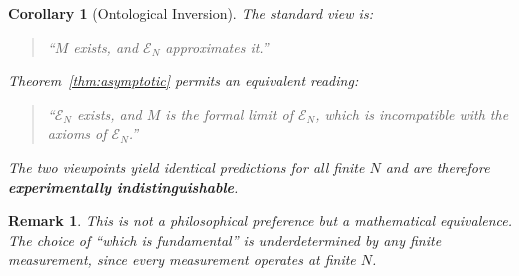 \documentclass[11pt]{article}
\newtheorem{corollary}[theorem]{Corollary}
\newtheorem{remark}[theorem]{Remark}
\begin{document}
\begin{corollary}[Ontological Inversion]\label{cor:inversion}
The standard view is:
\begin{quote}
``$M$ exists, and $\mathcal{E}_N$ approximates it.''
\end{quote}
Theorem~\ref{thm:asymptotic} permits an equivalent reading:
\begin{quote}
``$\mathcal{E}_N$ exists, and $M$ is the formal limit of
$\mathcal{E}_N$, which is incompatible with the axioms
of $\mathcal{E}_N$.''
\end{quote}
The two viewpoints yield identical predictions for all finite $N$
and are therefore \textbf{experimentally indistinguishable}.
\end{corollary}

\begin{remark}
This is not a philosophical preference but a mathematical
equivalence. The choice of ``which is fundamental'' is
underdetermined by any finite measurement, since
every measurement operates at finite $N$.
\end{remark}
\end{document}
